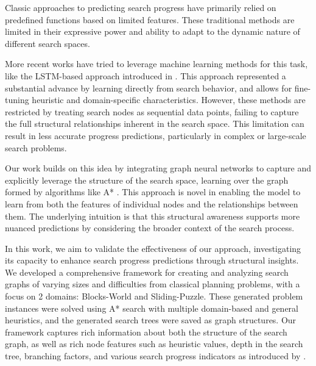 \documentclass[letterpaper]{article}
\newcommand{\naomi}[1]{{\color{magenta}{Naomi: #1}}}
\begin{document}
Classic approaches to predicting search progress have primarily relied on predefined functions based on limited features. These traditional methods are limited in their expressive power and ability to adapt to the dynamic nature of different search spaces. 


More recent works have tried to leverage machine learning methods for this task, like the LSTM-based approach introduced in \citet{sudry2022learning}. This approach represented a substantial advance by learning directly from search behavior, and allows for fine-tuning heuristic and domain-specific characteristics. However, these methods are restricted by treating search nodes as sequential data points, failing to capture the full structural relationships inherent in the search space. This limitation can result in less accurate progress predictions, particularly in complex or large-scale search problems.

Our work builds on this idea by integrating graph neural networks to capture and explicitly leverage the structure of the search space, learning over the graph formed by algorithms like A* \citep{hart1968formal}. This approach is novel in enabling the model to learn from both the features of individual nodes and the relationships between them. The underlying intuition is that this structural awareness supports more nuanced predictions by considering the broader context of the search process.

In this work, we aim to validate the effectiveness of our approach, investigating its capacity to enhance search progress predictions through structural insights. We developed a comprehensive framework for creating and analyzing search graphs of varying sizes and difficulties from classical planning problems, with a focus on 2 domains: Blocks-World and Sliding-Puzzle. These generated problem instances were solved using A* search with multiple domain-based and general heuristics, and the generated search trees were saved as graph structures. Our framework captures rich information about both the structure of the search graph, as well as rich node features such as heuristic values, depth in the search tree, branching factors, and various search progress indicators as introduced by \citet{sudry2022learning}.
\end{document}
